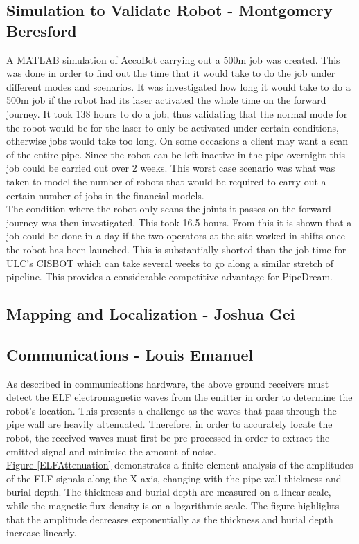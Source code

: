 \documentclass[11pt]{article}		%
\newcommand{\figref}[1]{\hyperref[#1]{Figure \ref*{#1}}}    %
\begin{document}
			
	    \subsection[Simulation to Validate Robot]{Simulation to Validate Robot - Montgomery Beresford}
	        
	   A MATLAB simulation of AccoBot carrying out a 500m job was created. This was done in order to find out the time that it would take to do the job under different modes and scenarios. 
	   It was investigated how long it would take to do a 500m job if the robot had its laser activated the whole time on the forward journey. It took 138 hours to do a job, thus validating that the normal mode for the robot would be for the laser to only be activated under certain conditions, otherwise jobs would take too long. On some occasions a client may want a scan of the entire pipe. Since the robot can be left inactive in the pipe overnight this job could be carried out over 2 weeks. This worst case scenario was what was taken to model the number of robots that would be required to carry out a certain number of jobs in the financial models.
	   \\
	   The condition where the robot only scans the joints it passes on the forward journey was then investigated. This took 16.5 hours. From this it is shown that a job could be done in a day if the two operators at the site worked in shifts once the robot has been launched. This is substantially shorted than the job time for ULC's CISBOT which can take several weeks to go along a similar stretch of pipeline. This provides a considerable competitive advantage for PipeDream.
	   
	        
		\subsection[Mapping and Localization]{Mapping and Localization - Joshua Gei}

       	    
       		
		\subsection[Communications]{Communications - Louis Emanuel}
		
			As described in communications hardware, the above ground receivers must detect the ELF electromagnetic waves from the emitter in order to determine the robot's location.
			This presents a challenge as the waves that pass through the pipe wall are heavily attenuated. 
			Therefore, in order to accurately locate the robot, the received waves must first be pre-processed in order to extract the emitted signal and minimise the amount of noise.
			\\
		    \hspace*{3ex}\figref{ELFAttenuation}  demonstrates a finite element analysis of the amplitudes of the ELF signals along the X-axis, changing with the pipe wall thickness and burial depth.
		    The thickness and burial depth are measured on a linear scale, while the magnetic flux density is on a logarithmic scale.
		    The figure highlights that the amplitude decreases exponentially as the thickness and burial depth increase linearly.
		    
\end{document}
